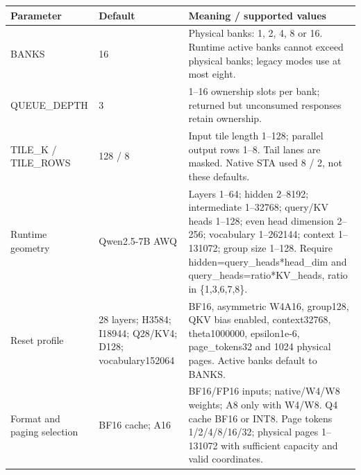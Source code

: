 \documentclass[11pt,a4paper]{article}
\begin{document}
{\small\renewcommand{\arraystretch}{1.18}\begin{longtable}{@{}L{0.22\textwidth}|L{0.21\textwidth}|L{0.49\textwidth}@{}}\toprule

\textbf{Parameter} & \textbf{Default} & \textbf{Meaning /\allowbreak{} supported values}\\\midrule\endhead

BANKS & 16 & Physical banks: 1,\allowbreak{} 2,\allowbreak{} 4,\allowbreak{} 8 or 16. Runtime active banks cannot exceed physical banks; legacy modes use at most eight.\\[2pt]\hline

QUEUE\_\allowbreak{}DEPTH & 3 & 1–16 ownership slots per bank; returned but unconsumed responses retain ownership.\\[2pt]\hline

TILE\_\allowbreak{}K /\allowbreak{} TILE\_\allowbreak{}ROWS & 128 /\allowbreak{} 8 & Input tile length 1–128; parallel output rows 1–8. Tail lanes are masked. Native STA used 8 /\allowbreak{} 2,\allowbreak{} not these defaults.\\[2pt]\hline

Runtime geometry & Qwen2.5-7B AWQ & Layers 1–64; hidden 2–8192; intermediate 1–32768; query/\allowbreak{}KV heads 1–128; even head dimension 2–256; vocabulary 1–262144; context 1–131072; group size 1–128. Require hidden=\allowbreak{}query\_\allowbreak{}heads*\allowbreak{}head\_\allowbreak{}dim and query\_\allowbreak{}heads=\allowbreak{}ratio*\allowbreak{}KV\_\allowbreak{}heads,\allowbreak{} ratio in \{1,\allowbreak{}3,\allowbreak{}6,\allowbreak{}7,\allowbreak{}8\}.\\[2pt]\hline

Reset profile & 28 layers; H3584; I18944; Q28/\allowbreak{}KV4; D128; vocabula\allowbreak{}ry152064 & BF16,\allowbreak{} asymmetric W4A16,\allowbreak{} group128,\allowbreak{} QKV bias enabled,\allowbreak{} context3\allowbreak{}2768,\allowbreak{} theta100\allowbreak{}0000,\allowbreak{} epsilon1\allowbreak{}e-6,\allowbreak{} page\_\allowbreak{}tokens32 and 1024 physical pages. Active banks default to BANKS.\\[2pt]\hline

Format and paging selection & BF16 cache; A16 & BF16/\allowbreak{}FP16 inputs; native/\allowbreak{}W4/\allowbreak{}W8 weights; A8 only with W4/\allowbreak{}W8. Q4 cache BF16 or INT8. Page tokens 1/\allowbreak{}2/\allowbreak{}4/\allowbreak{}8/\allowbreak{}16/\allowbreak{}32; physical pages 1–131072 with sufficient capacity and valid coordinates.\\[2pt]\hline

\bottomrule\end{longtable}}
\end{document}
